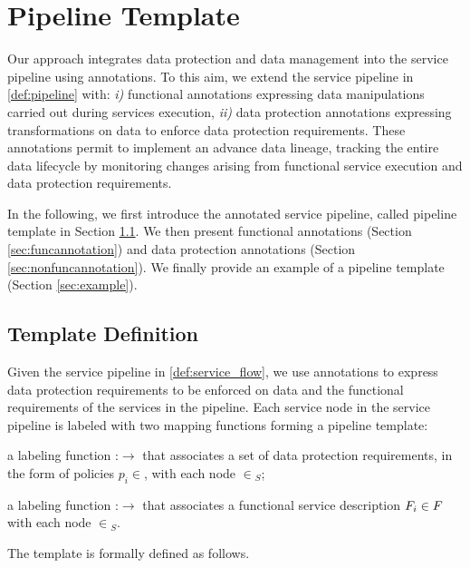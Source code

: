 \section{Pipeline Template}
Our approach integrates data protection and data management into the service pipeline using annotations.
To this aim, we extend the service pipeline in \cref{def:pipeline} with: \emph{i)} functional annotations expressing data manipulations carried out during services execution, \emph{ii)} data protection annotations expressing transformations on data to enforce data protection requirements.
These annotations permit to implement an advance data lineage, tracking the entire data lifecycle by monitoring changes arising from functional service execution and data protection requirements.

In the following, we first introduce the annotated service pipeline, called pipeline template in Section \ref{sec:templatedefinition}. We then present functional annotations (Section \ref{sec:funcannotation}) and data protection annotations (Section \ref{sec:nonfuncannotation}). We finally provide an example of a pipeline template (Section \ref{sec:example}).


\subsection{Template Definition}\label{sec:templatedefinition}
Given the service pipeline in \cref{def:service_flow}, we use annotations to express data protection requirements to be enforced on data and the functional requirements of the services in the pipeline. Each service node in the service pipeline is labeled with two mapping functions forming a pipeline template:
\begin{enumerate*}[label=\roman*)]
  \item a labeling function \myLambda:\V$\rightarrow$\Pset{} that associates a set of data protection requirements, in the form of policies $p_i\in$\Pset{}, with each node $\in$\V$_S$; 
  \item a labeling function \myGamma:\V$\rightarrow$\F{} that associates a functional service description $F_i\in F_{}$ with each node $\in$\V$_S$.
\end{enumerate*}

The template is formally defined as follows.

